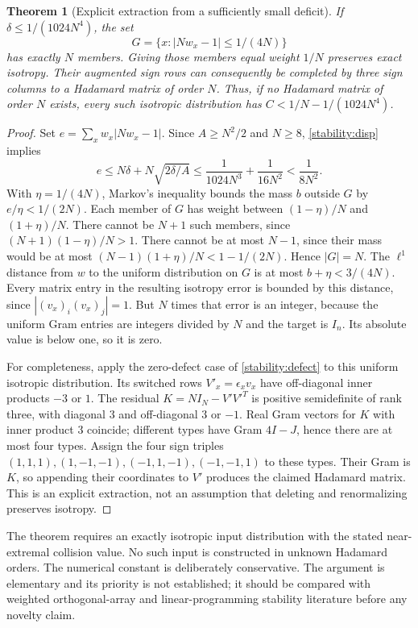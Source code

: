 \documentclass[11pt]{article}
\newtheorem{theorem}{Theorem}[section]
\begin{document}
\begin{theorem}[Explicit extraction from a sufficiently small deficit]
If $\delta\le1/(1024N^4)$, the set
\[
 G=\{x:|Nw_x-1|\le1/(4N)\}
\]
has exactly $N$ members. Giving those members equal weight $1/N$
preserves exact isotropy. Their augmented sign rows can consequently
be completed by three sign columns to a Hadamard matrix of order $N$.
Thus, if no Hadamard matrix of order $N$ exists, every such isotropic
distribution has $C<1/N-1/(1024N^4)$.
\end{theorem}
\begin{proof}
Set $e=\sum_xw_x|Nw_x-1|$. Since $A\ge N^2/2$ and $N\ge8$,
\eqref{stability:disp} implies
\[
 e\le N\delta+N\sqrt{2\delta/A}
 \le\frac1{1024N^3}+\frac1{16N^2}<\frac1{8N^2}.
\]
With $\eta=1/(4N)$, Markov's inequality bounds the mass $b$ outside
$G$ by $e/\eta<1/(2N)$. Each member of $G$ has weight between
$(1-\eta)/N$ and $(1+\eta)/N$. There cannot be $N+1$ such members,
since $(N+1)(1-\eta)/N>1$. There cannot be at most $N-1$, since
their mass would be at most $(N-1)(1+\eta)/N<1-1/(2N)$.
Hence $|G|=N$.
The $\ell^1$ distance from $w$ to the uniform distribution on $G$ is
at most $b+\eta<3/(4N)$. Every matrix entry in the resulting isotropy
error is bounded by this distance, since $|(v_x)_i(v_x)_j|=1$.
But $N$ times that error is an integer, because the uniform Gram
entries are integers divided by $N$ and the target is $I_n$.
Its absolute value is below one, so it is zero.

For completeness, apply the zero-defect case of \eqref{stability:defect} to
this uniform isotropic distribution. Its switched rows
$V'_x=\epsilon_xv_x$ have off-diagonal inner products $-3$ or $1$.
The residual $K=NI_N-V'V'^T$ is positive semidefinite of rank three,
with diagonal $3$ and off-diagonal $3$ or $-1$. Real Gram vectors for
$K$ with inner product $3$ coincide; different types have Gram
$4I-J$, hence there are at most four types. Assign the four sign
triples $(1,1,1),(1,-1,-1),(-1,1,-1),(-1,-1,1)$ to these types.
Their Gram is $K$, so appending their coordinates to $V'$ produces
the claimed Hadamard matrix. This is an explicit extraction, not an
assumption that deleting and renormalizing preserves isotropy.
\end{proof}

The theorem requires an exactly isotropic input distribution with the
stated near-extremal collision value. No such input is constructed in
unknown Hadamard orders. The numerical constant is deliberately
conservative. The argument is elementary and its priority is not
established; it should be compared with weighted orthogonal-array and
linear-programming stability literature before any novelty claim.
\end{document}
